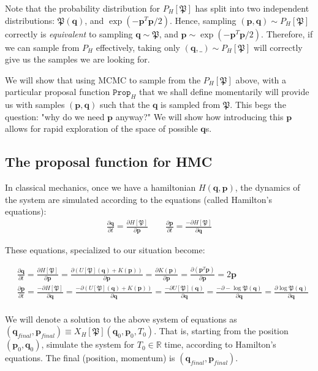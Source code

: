 \documentclass[titlepage]{article}
\newcommand{\p}{\mathbf{p}}
\newcommand{\q}{\mathbf{q}}
\renewcommand{\P}{\mathfrak{P}}
\newcommand{\Prop}{\texttt{Prop}}
\begin{document}
Note that the probability distribution for $P_H[\P]$ has split into two
independent distributions: $\P(\q)$, and $\exp(-\p^T \p/2)$. Hence,
sampling $(\p, \q) \sim P_H[\P]$ correctly is \emph{equivalent} to 
sampling $\q \sim \P$, and $\p \sim \exp(-\p^T\p/2)$. Therefore, if we can
sample from $P_H$ effectively, taking only $(\q, \_) \sim P_H[\P]$ will
correctly give us the samples we are looking for.

We will show that using MCMC to sample from the $P_H[\P]$ above, with a particular
proposal function $\Prop_H$ that we shall define momentarily will provide
us with samples $(\p, \q)$ such that the $\q$ is sampled from $\P$.
This begs the question: "why do we need $\p$ anyway?" We will
show how introducing this $\p$ allows for rapid exploration of the space of possible
$\q$s.

\subsection{The proposal function for HMC}

In classical mechanics, once we have a hamiltonian $H(\q, \p)$, the dynamics of the
system are simulated according to the equations (called Hamilton's equations):
\begin{align*}
\frac{\partial \q}{\partial t} = \frac{\partial H[\P]}{\partial \p} \qquad
\frac{\partial \p}{\partial t} =  \frac{-\partial H[\P]}{\partial \q} 
\end{align*}

These equations, specialized to our situation become:

{\footnotesize
\begin{align*}              
    &\frac{\partial \q}{\partial t} 
      = \frac{\partial H[\P]}{\partial \p} 
      = \frac{\partial (U[\P](\q) + K(\p))}{\partial \p} 
      = \frac{\partial K(\p)}{\partial \p} 
      = \frac{\partial (\p^T \p)}{\partial \p} = 2\p \\
&\frac{\partial \p}{\partial t} 
    =  \frac{-\partial H[\P]}{\partial \q} 
    = \frac{-\partial (U[\P](\q) + K(\p))}{\partial \q}  
    = \frac{-\partial U[\P](\q)}{\partial \q}  
    =  \frac{-\partial -\log \P(\q)}{\partial \q} 
    =  \frac{\partial \log \P(\q)}{\partial \q}  \\
\end{align*}
}

We will denote a solution to the above system of equations as 
$(\q_{final}, \p_{final}) \equiv X_H[\P](\q_0, \p_0, T_0)$. That is, starting
from the position $(\p_0, \q_0)$, simulate the system for $T_0 \in \mathbb R$
time, according to Hamilton's equations. The final (position, momentum)
is $(\q_{final}, \p_{final})$.
\end{document}
